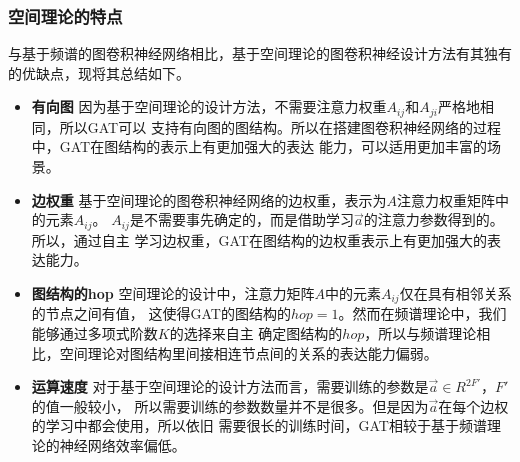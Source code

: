 \subsubsection{空间理论的特点}
与基于频谱的图卷积神经网络相比，基于空间理论的图卷积神经设计方法有其独有的优缺点，现将其总结如下。
\begin{itemize}
    \item \textbf{有向图} \quad
    因为基于空间理论的设计方法，不需要注意力权重$A_{ij}$和$A_{ji}$严格地相同，所以GAT可以
    支持有向图的图结构。所以在搭建图卷积神经网络的过程中，GAT在图结构的表示上有更加强大的表达
    能力，可以适用更加丰富的场景。
    
    \item \textbf{边权重} \quad
    基于空间理论的图卷积神经网络的边权重，表示为$ A $注意力权重矩阵中的元素$A_{ij}$。
    $A_{ij}$是不需要事先确定的，而是借助学习$ \vec{a} $的注意力参数得到的。所以，通过自主
    学习边权重，GAT在图结构的边权重表示上有更加强大的表达能力。

    \item \textbf{图结构的hop} \quad
    空间理论的设计中，注意力矩阵$ A $中的元素$A_{ij}$仅在具有相邻关系的节点之间有值，
    这使得GAT的图结构的$ hop=1 $。然而在频谱理论中，我们能够通过多项式阶数$ K $的选择来自主
    确定图结构的$ hop $，所以与频谱理论相比，空间理论对图结构里间接相连节点间的关系的表达能力偏弱。

    \item \textbf{运算速度} \quad
    对于基于空间理论的设计方法而言，需要训练的参数是$ \vec{a} \in R^{2F'} $，$F'$的值一般较小，
    所以需要训练的参数数量并不是很多。但是因为$ \vec{a} $在每个边权的学习中都会使用，所以依旧
    需要很长的训练时间，GAT相较于基于频谱理论的神经网络效率偏低。

\end{itemize}